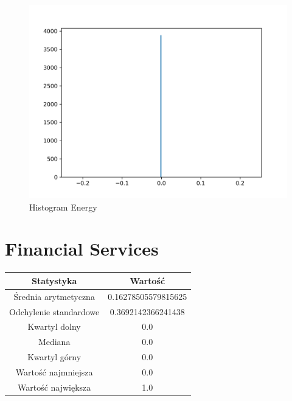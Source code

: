 \documentclass{article}
\begin{document}
\begin{figure}[h!]
    \includegraphics[width=\linewidth]{variables/Energy.png}
    \caption{Histogram Energy }
\end{figure}\section{ Financial Services }

\begin{center}
    \begin{tabular}{|c | c|} 
    \hline
    Statystyka & Wartość \\
    \hline\hline
    Średnia arytmetyczna & 0.16278505579815625 \\ 
    \hline
    Odchylenie standardowe & 0.3692142366241438 \\
    \hline
    Kwartyl dolny & 0.0 \\
    \hline
    Mediana & 0.0 \\
    \hline
    Kwartyl górny & 0.0 \\
    \hline
    Wartość najmniejsza & 0.0 \\
    \hline
    Wartość największa & 1.0 \\
    \hline
   \end{tabular}
\end{center}
\end{document}

